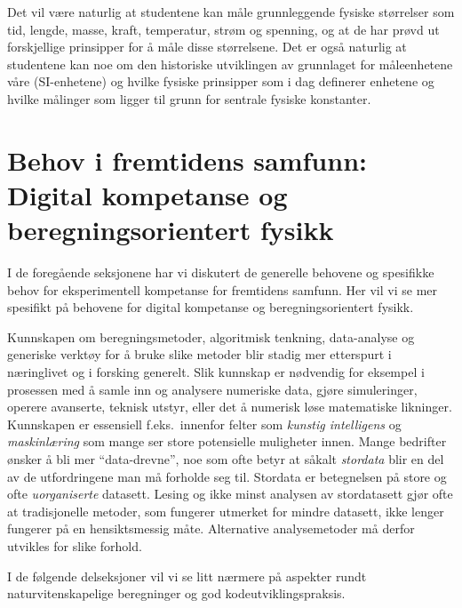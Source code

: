 \documentclass{article}
\begin{document}
Det vil være naturlig at studentene kan måle grunnleggende fysiske størrelser som tid, lengde, masse, kraft, temperatur, strøm og spenning, og at de har prøvd ut forskjellige prinsipper for å måle disse størrelsene. Det er også naturlig at studentene kan noe om den historiske utviklingen av grunnlaget for måleenhetene våre (SI-enhetene) og hvilke fysiske prinsipper som i dag definerer enhetene og hvilke målinger som ligger til grunn for sentrale fysiske konstanter.


\section{Behov i fremtidens samfunn: Digital kompetanse og beregningsorientert fysikk}
\label{sec:behov-dig}
I de foregående seksjonene har vi diskutert de generelle behovene og spesifikke behov for eksperimentell kompetanse for fremtidens samfunn. Her vil vi se mer spesifikt på behovene for digital kompetanse og beregningsorientert fysikk.


Kunnskapen om beregningsmetoder, algoritmisk tenkning, data-analyse og generiske verktøy for å bruke slike metoder blir stadig mer etterspurt i næringlivet og i forsking generelt.
Slik kunnskap er nødvendig for eksempel i prosessen med å samle inn og analysere numeriske data, gjøre simuleringer, operere avanserte, teknisk utstyr, eller det å numerisk løse matematiske likninger.
Kunnskapen er essensiell f.eks.~innenfor felter som \emph{kunstig intelligens} og \emph{maskinlæring} som mange ser store potensielle muligheter innen.
Mange bedrifter ønsker å bli mer ``data-drevne'', noe som ofte betyr at såkalt \emph{stordata} blir en del av de utfordringene man må forholde seg til.
Stordata er betegnelsen på store og ofte \emph{uorganiserte} datasett.
Lesing og ikke minst analysen av stordatasett gjør ofte at tradisjonelle metoder, som fungerer utmerket for mindre datasett, ikke lenger fungerer på en hensiktsmessig måte.
Alternative analysemetoder må derfor utvikles for slike forhold.

I de følgende delseksjoner vil vi se litt nærmere på aspekter rundt naturvitenskapelige beregninger og god kodeutviklingspraksis.
\end{document}
